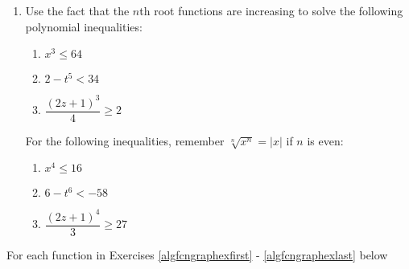 \documentclass{ximera}
\begin{document}
\begin{enumerate}
\setcounter{enumi}{\value{HW}}



\item  \label{rootstosolvepolyineq} Use the fact that the $n$th root functions are increasing to solve the following polynomial inequalities:

\begin{multicols}{3}

\begin{enumerate}

\item  $x^3 \leq 64$    %

\item  $2 - t^5 <  34$    %

\item $\dfrac{(2z+1)^3}{4} \geq 2$ %

\setcounter{HWindent}{\value{enumii}}

\end{enumerate}
\end{multicols}

For the following inequalities, remember $\sqrt[n]{x^{n}} = |x|$ if $n$ is even:

\begin{multicols}{3}

\begin{enumerate}
\setcounter{enumii}{\value{HWindent}}

\item  $x^4 \leq 16$    %

\item  $6-t^6 < -58$    %

\item $\dfrac{(2z+1)^4}{3} \geq 27$ %

\end{enumerate}

\end{multicols}

\setcounter{HW}{\value{enumi}}
\end{enumerate}


For each function in Exercises \ref{algfcngraphexfirst} - \ref{algfcngraphexlast} below 
\end{document}
